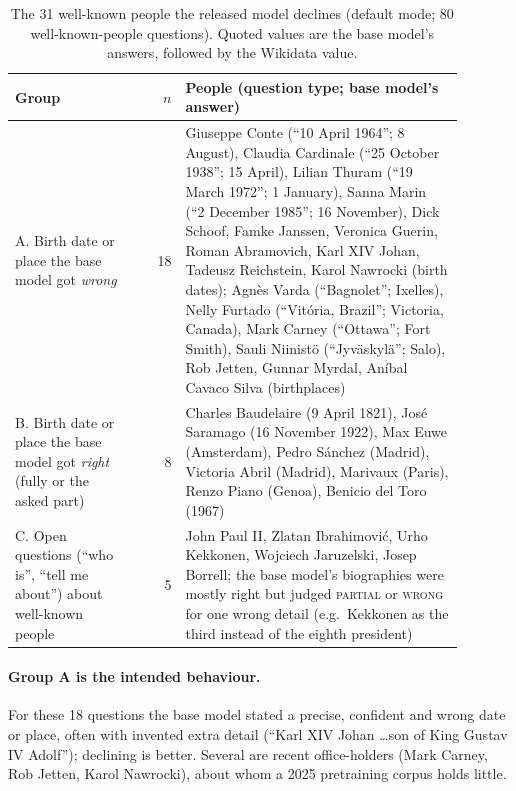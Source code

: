 \documentclass[11pt,a4paper]{article}
\begin{document}
\begin{table}[t]
\centering
\small
\begin{tabular}{@{}p{0.27\linewidth}rp{0.62\linewidth}@{}}
\toprule
Group & $n$ & People (question type; base model's answer) \\
\midrule
A. Birth date or place the base model got \emph{wrong} & 18 &
Giuseppe Conte (``10 April 1964''; 8 August), Claudia Cardinale (``25 October 1938''; 15 April), Lilian Thuram (``19 March 1972''; 1 January), Sanna Marin (``2 December 1985''; 16 November), Dick Schoof, Famke Janssen, Veronica Guerin, Roman Abramovich, Karl XIV Johan, Tadeusz Reichstein, Karol Nawrocki (birth dates); Agnès Varda (``Bagnolet''; Ixelles), Nelly Furtado (``Vitória, Brazil''; Victoria, Canada), Mark Carney (``Ottawa''; Fort Smith), Sauli Niinistö (``Jyväskylä''; Salo), Rob Jetten, Gunnar Myrdal, Aníbal Cavaco Silva (birthplaces) \\
\addlinespace
B. Birth date or place the base model got \emph{right} (fully or the asked part) & 8 &
Charles Baudelaire (9 April 1821), José Saramago (16 November 1922), Max Euwe (Amsterdam), Pedro Sánchez (Madrid), Victoria Abril (Madrid), Marivaux (Paris), Renzo Piano (Genoa), Benicio del Toro (1967) \\
\addlinespace
C. Open questions (``who is'', ``tell me about'') about well-known people & 5 &
John Paul II, Zlatan Ibrahimović, Urho Kekkonen, Wojciech Jaruzelski, Josep Borrell; the base model's biographies were mostly right but judged \textsc{partial} or \textsc{wrong} for one wrong detail (e.g.\ Kekkonen as the third instead of the eighth president) \\
\bottomrule
\end{tabular}
\caption{The 31 well-known people the released model declines (default mode; 80 well-known-people questions). Quoted values are the base model's answers, followed by the Wikidata value.}
\label{tab:declines}
\end{table}

\paragraph{Group A is the intended behaviour.}
For these 18 questions the base model stated a precise, confident and wrong date or place, often with invented extra detail (``Karl XIV Johan \ldots son of King Gustav IV Adolf''); declining is better.
Several are recent office-holders (Mark Carney, Rob Jetten, Karol Nawrocki), about whom a 2025 pretraining corpus holds little.
\end{document}
